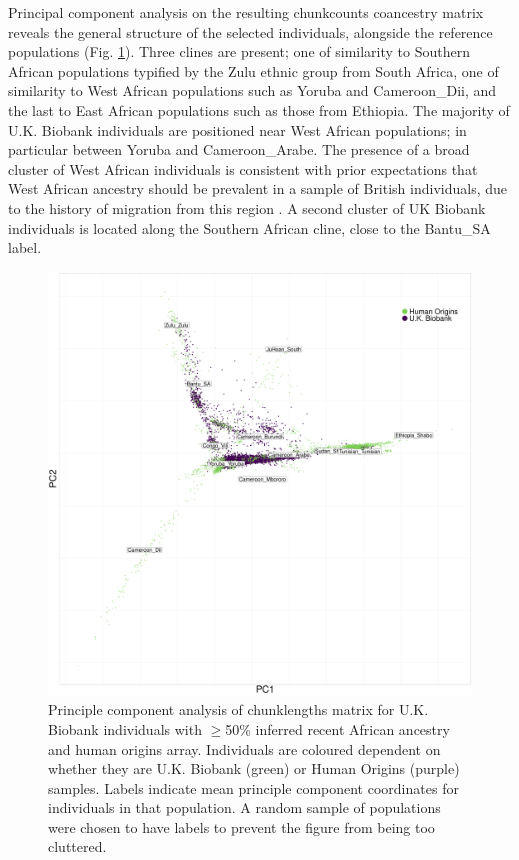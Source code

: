 Principal component analysis on the resulting chunkcounts coancestry matrix reveals the general structure of the selected individuals, alongside the reference populations (Fig. \ref{fig:PCA_chunklengths_HumanOrigins_U.K.Biobank}). Three clines are present; one of similarity to Southern African populations typified by the Zulu ethnic group from South Africa, one of similarity to West African populations such as Yoruba and Cameroon\_Dii, and the last to East African populations such as those from Ethiopia. The majority of U.K. Biobank individuals are positioned near West African populations; in particular between Yoruba and Cameroon\_Arabe. The presence of a broad cluster of West African individuals is consistent with prior expectations that West African ancestry should be prevalent in a sample of British individuals, due to the history of migration from this region \cite{banton1953recent}. A second cluster of UK Biobank individuals is located along the Southern African cline, close to the Bantu\_SA label. 

\begin{figure}[htp]
    \centering
    \includegraphics[width=1.0\textwidth]{../images/chapter3/ChromoPainter_PCA_UKB_HO.pdf}
    \caption{Principle component analysis of chunklengths matrix for U.K. Biobank individuals with $\geq$50\% inferred recent African ancestry and human origins array. Individuals are coloured dependent on whether they are U.K. Biobank (green) or Human Origins (purple) samples. Labels indicate mean principle component coordinates for individuals in that population. A random sample of populations were chosen to have labels to prevent the figure from being too cluttered.}
    \label{fig:PCA_chunklengths_HumanOrigins_U.K.Biobank}
\end{figure}

